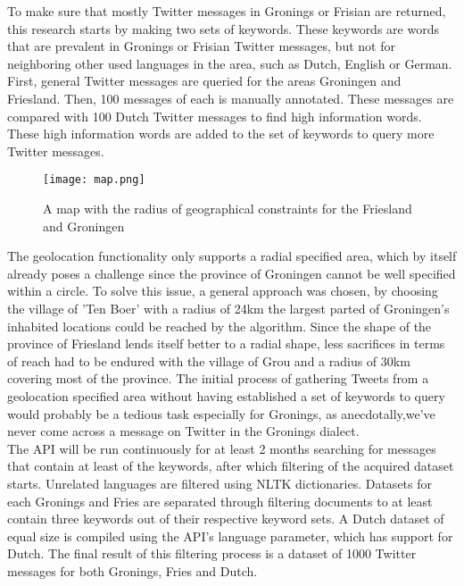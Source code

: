 \documentclass[
10pt, %
a4paper, %
oneside, %
headinclude,footinclude, %
] {book}%
\begin{document}
To make sure that mostly Twitter messages in Gronings or Frisian are returned, this research starts by making two sets of keywords. These keywords are words that are prevalent in Gronings or Frisian Twitter messages, but not for neighboring other used languages in the area, such as Dutch, English or German. First, general Twitter messages are queried for the areas Groningen and Friesland. Then, 100 messages of each is manually annotated. These messages are compared with 100 Dutch Twitter messages to find high information words. These high information words are added to the set of keywords to query more Twitter messages. 

\begin{figure}[t]
  \texttt{[image: map.png]}
  \caption{A map with the radius of geographical constraints for the Friesland and Groningen}
\end{figure}


The geolocation functionality only supports a radial specified area, which by itself already poses a challenge since the province of Groningen cannot be well specified within a circle. To solve this issue, a general approach was chosen, by choosing the village of 'Ten Boer' with a radius of 24km the largest parted of Groningen's inhabited locations could be reached by the algorithm. Since the shape of the province of Friesland lends itself better to a radial shape, less sacrifices in terms of reach had to be endured with the village of Grou and a radius of 30km covering most of the province. The initial process of gathering Tweets from a geolocation specified area without having established a set of keywords to query would probably be a tedious task especially for Gronings, as anecdotally,we've never come across a message on Twitter in the Gronings dialect. \\

The API will be run continuously for at least 2 months searching for messages that contain at least of the keywords, after which filtering of the acquired dataset starts. Unrelated languages are filtered using NLTK dictionaries. Datasets for each Gronings and Fries are separated through filtering documents to at least contain three keywords out of their respective keyword sets. A Dutch dataset of equal size is compiled using the API's language parameter, which has support for Dutch. The final result of this filtering process is a dataset of 1000 Twitter messages for both Gronings, Fries and Dutch.

\newpage
\end{document}
